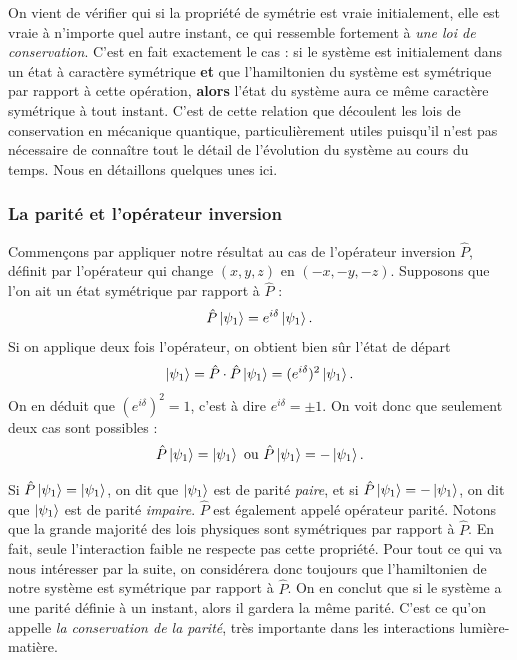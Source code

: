 On vient de vérifier qui si la propriété de symétrie est vraie initialement, elle est vraie à n'importe quel autre instant, ce qui ressemble fortement à \textit{une loi de conservation}. C'est en fait exactement le cas : si le système est initialement dans un état à caractère symétrique \textbf{et} que l'hamiltonien du système est symétrique par rapport à cette opération, \textbf{alors} l'état du système aura ce même caractère symétrique à tout instant. C'est de cette relation que découlent les lois de conservation en mécanique quantique, particulièrement utiles puisqu'il n'est pas nécessaire de connaître tout le détail de l'évolution du système au cours du temps. Nous en détaillons quelques unes ici.

\subsubsection{La parité et l'opérateur inversion}
Commençons par appliquer notre résultat au cas de l'opérateur inversion $\hat{P}$, définit par l'opérateur qui change $(x,y,z)$ en $(-x,-y,-z)$. Supposons que l'on ait un état symétrique par rapport à $\hat{P}$ : 
\begin{equation*}
\hat{P}\ket{\psi_1} = e^{i\delta}\ket{\psi_1}.
\end{equation*}
Si on applique deux fois l'opérateur, on obtient bien sûr l'état de départ
\begin{equation*}
\ket{\psi_1} = \hat{P}\cdot\hat{P}\ket{\psi_1} = (e^{i\delta})^2\ket{\psi_1}.
\end{equation*}
On en déduit que $(e^{i\delta})^2=1$, c'est à dire $e^{i\delta}=\pm1$. On voit donc que seulement deux cas sont possibles :
\begin{equation*}
\hat{P}\ket{\psi_1} = \ket{\psi_1} \mbox{ ou } \hat{P}\ket{\psi_1} = -\ket{\psi_1}.
\end{equation*}

Si $\hat{P}\ket{\psi_1}= \ket{\psi_1}$, on dit que $\ket{\psi_1}$ est de parité \textit{paire}, et si $\hat{P}\ket{\psi_1}= -\ket{\psi_1}$, on dit que $\ket{\psi_1}$ est de parité \textit{impaire}. $\hat{P}$ est également appelé opérateur parité. Notons que la grande majorité des lois physiques sont symétriques par rapport à $\hat{P}$. En fait, seule l'interaction faible ne respecte pas cette propriété. Pour tout ce qui va nous intéresser par la suite, on considérera donc toujours que l'hamiltonien de notre système est symétrique par rapport à $\hat{P}$. On en conclut que si le système a une parité définie à un instant, alors il gardera la même parité. C'est ce qu'on appelle \textit{la conservation de la parité}, très importante dans les interactions lumière-matière.

